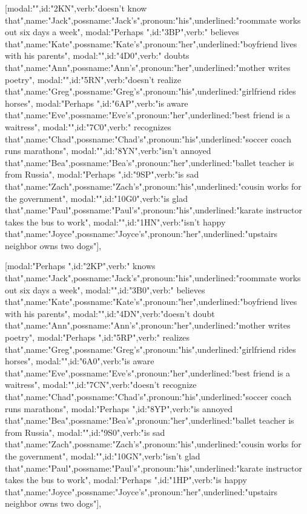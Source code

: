 [{modal:"",id:"2KN",verb:"doesn't know that",name:"Jack",possname:"Jack's",pronoun:"his",underlined:"roommate works out six days a week"},
{modal:"Perhaps ",id:"3BP",verb:" believes that",name:"Kate",possname:"Kate's",pronoun:"her",underlined:"boyfriend lives with his parents"},
{modal:"",id:"4D0",verb:" doubts that",name:"Ann",possname:"Ann's",pronoun:"her",underlined:"mother writes poetry"},
{modal:"",id:"5RN",verb:"doesn't realize that",name:"Greg",possname:"Greg's",pronoun:"his",underlined:"girlfriend rides horses"},
{modal:"Perhaps ",id:"6AP",verb:"is aware that",name:"Eve",possname:"Eve's",pronoun:"her",underlined:"best friend is a waitress"},
{modal:"",id:"7C0",verb:" recognizes that",name:"Chad",possname:"Chad's",pronoun:"his",underlined:"soccer coach runs marathons"},
{modal:"",id:"8YN",verb:"isn't annoyed that",name:"Bea",possname:"Bea's",pronoun:"her",underlined:"ballet teacher is from Russia"},
{modal:"Perhaps ",id:"9SP",verb:"is sad that",name:"Zach",possname:"Zach's",pronoun:"his",underlined:"cousin works for the government"},
{modal:"",id:"10G0",verb:"is glad that",name:"Paul",possname:"Paul's",pronoun:"his",underlined:"karate instructor takes the bus to work"},
{modal:"",id:"1HN",verb:"isn't happy that",name:"Joyce",possname:"Joyce's",pronoun:"her",underlined:"upstairs neighbor owns two dogs"}],

[{modal:"Perhaps ",id:"2KP",verb:" knows that",name:"Jack",possname:"Jack's",pronoun:"his",underlined:"roommate works out six days a week"},
{modal:"",id:"3B0",verb:" believes that",name:"Kate",possname:"Kate's",pronoun:"her",underlined:"boyfriend lives with his parents"},
{modal:"",id:"4DN",verb:"doesn't doubt that",name:"Ann",possname:"Ann's",pronoun:"her",underlined:"mother writes poetry"},
{modal:"Perhaps ",id:"5RP",verb:" realizes that",name:"Greg",possname:"Greg's",pronoun:"his",underlined:"girlfriend rides horses"},
{modal:"",id:"6A0",verb:"is aware that",name:"Eve",possname:"Eve's",pronoun:"her",underlined:"best friend is a waitress"},
{modal:"",id:"7CN",verb:"doesn't recognize that",name:"Chad",possname:"Chad's",pronoun:"his",underlined:"soccer coach runs marathons"},
{modal:"Perhaps ",id:"8YP",verb:"is annoyed that",name:"Bea",possname:"Bea's",pronoun:"her",underlined:"ballet teacher is from Russia"},
{modal:"",id:"9S0",verb:"is sad that",name:"Zach",possname:"Zach's",pronoun:"his",underlined:"cousin works for the government"},
{modal:"",id:"10GN",verb:"isn't glad that",name:"Paul",possname:"Paul's",pronoun:"his",underlined:"karate instructor takes the bus to work"},
{modal:"Perhaps ",id:"1HP",verb:"is happy that",name:"Joyce",possname:"Joyce's",pronoun:"her",underlined:"upstairs neighbor owns two dogs"}],

